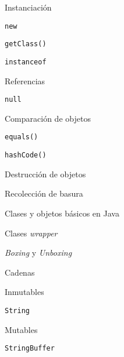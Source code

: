 \begin{longenum}
\begin{longenum}
        \begin{longenum}
            \item Instanciación
            \begin{longenum}
                \item \texttt{new}
                \item \texttt{getClass()}
                \item \texttt{instanceof}
            \end{longenum}
            \item Referencias
            \begin{longenum}
                \item \texttt{null}
            \end{longenum}
            \item Comparación de objetos
            \begin{longenum}
                \item \texttt{equals()}
                \item \texttt{hashCode()}
            \end{longenum}
            \item Destrucción de objetos
            \begin{longenum}
                \item Recolección de basura
            \end{longenum}
        \end{longenum}
        \item Clases y objetos básicos en Java
        \begin{longenum}
            \item Clases \textit{wrapper}
            \begin{longenum}
                \item \textit{Boxing} y \textit{Unboxing}
            \end{longenum}
            \item Cadenas
            \begin{longenum}
                \item Inmutables
                \begin{longenum}
                    \item \texttt{String}
                \end{longenum}
                \item Mutables
                \begin{longenum}
                    \item \texttt{StringBuffer}

\end{longenum}
\end{longenum}
\end{longenum}
\end{longenum}
\end{longenum}
